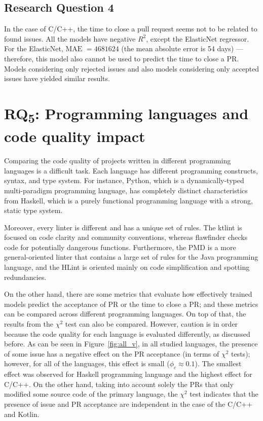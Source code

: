 \documentclass[digital,oneside,oldtable,nolof,nolot,nocover]{fithesis4}
\begin{document}
\subsection{Research Question 4}
\label{sec:org6869e3b}
In the case of C/C++, the time to close a pull request seems not to be related
to found issues.  All the models have negative \(R^2\), except the ElasticNet
regressor. For the ElasticNet, \(\text{MAE } = 4681624\) (the mean absolute error is 54
days) --- therefore, this model also cannot be used to predict the time to
close a PR.  Models considering only rejected issues and also models
considering only accepted issues have yielded similar results.
\FloatBarrier
\section{RQ\textsubscript{5}: Programming languages and code quality impact}
\label{sec:org2749978}
Comparing the code quality of projects written in different programming
languages is a difficult task.  Each language has different programming
constructs, syntax, and type system. For instance, Python, which is
a dynamically-typed multi-paradigm programming language, has completely
distinct characteristics from Haskell, which is a purely functional programming
language with a strong, static type system.

Moreover, every linter is different and has a unique set of rules.  The
ktlint is focused on code clarity and community conventions, whereas
flawfinder checks code for potentially dangerous functions. Furthermore,
the PMD is a more general-oriented linter that contains a large set of
rules for the Java programming language, and the HLint is oriented mainly
on code simplification and spotting redundancies.

On the other hand, there are some metrics that evaluate how effectively
trained models predict the acceptance of PR or the time to close a PR;
and these metrics can be compared across different programming languages.
On top of that, the results from the \(\chi^2\) test can also be compared.
However, caution is in order because the code quality for each language is
evaluated differently, as discussed before.
As can be seen in Figure~\ref{fig:all_v}, in all studied languages, the
presence of some issue has a negative effect on the PR acceptance (in terms
of \(\chi^2\) tests); however, for all of the languages, this effect is small (\(\phi_c
   \approx 0.1\)).  The smallest effect was observed for Haskell programming
language and the highest effect for C/C++.  On the other hand,
taking into account solely the PRs that only modified some source code of the
primary language, the \(\chi^2\) test indicates that the presence of issue and PR
acceptance are independent in the case of the C/C++ and Kotlin.
\end{document}

